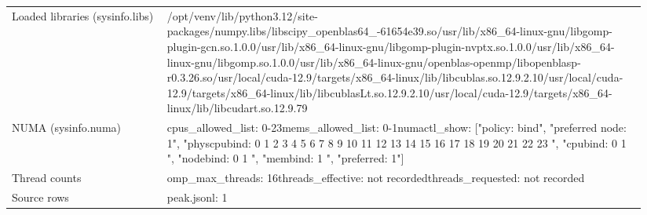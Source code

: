 \begin{longtable}{>{\raggedright\arraybackslash}p{0.23\linewidth}>{\raggedright\arraybackslash}p{0.71\linewidth}}
Loaded libraries (sysinfo.libs) & /\allowbreak{}opt/\allowbreak{}venv/\allowbreak{}lib/\allowbreak{}python3.12/\allowbreak{}site-packages/\allowbreak{}numpy.libs/\allowbreak{}libscipy\_\allowbreak{}openblas64\_\allowbreak{}-61654e39.so\newline /\allowbreak{}usr/\allowbreak{}lib/\allowbreak{}x86\_\allowbreak{}64-linux-gnu/\allowbreak{}libgomp-plugin-gcn.so.1.0.0\newline /\allowbreak{}usr/\allowbreak{}lib/\allowbreak{}x86\_\allowbreak{}64-linux-gnu/\allowbreak{}libgomp-plugin-nvptx.so.1.0.0\newline /\allowbreak{}usr/\allowbreak{}lib/\allowbreak{}x86\_\allowbreak{}64-linux-gnu/\allowbreak{}libgomp.so.1.0.0\newline /\allowbreak{}usr/\allowbreak{}lib/\allowbreak{}x86\_\allowbreak{}64-linux-gnu/\allowbreak{}openblas-openmp/\allowbreak{}libopenblasp-r0.3.26.so\newline /\allowbreak{}usr/\allowbreak{}local/\allowbreak{}cuda-12.9/\allowbreak{}targets/\allowbreak{}x86\_\allowbreak{}64-linux/\allowbreak{}lib/\allowbreak{}libcublas.so.12.9.2.10\newline /\allowbreak{}usr/\allowbreak{}local/\allowbreak{}cuda-12.9/\allowbreak{}targets/\allowbreak{}x86\_\allowbreak{}64-linux/\allowbreak{}lib/\allowbreak{}libcublasLt.so.12.9.2.10\newline /\allowbreak{}usr/\allowbreak{}local/\allowbreak{}cuda-12.9/\allowbreak{}targets/\allowbreak{}x86\_\allowbreak{}64-linux/\allowbreak{}lib/\allowbreak{}libcudart.so.12.9.79 \\
NUMA (sysinfo.numa) & cpus\_\allowbreak{}allowed\_\allowbreak{}list: 0-23\newline mems\_\allowbreak{}allowed\_\allowbreak{}list: 0-1\newline numactl\_\allowbreak{}show: ["policy: bind", "preferred node: 1", "physcpubind: 0 1 2 3 4 5 6 7 8 9 10 11 12 13 14 15 16 17 18 19 20 21 22 23 ", "cpubind: 0 1 ", "nodebind: 0 1 ", "membind: 1 ", "preferred: 1"] \\
Thread counts & omp\_\allowbreak{}max\_\allowbreak{}threads: 16\newline threads\_\allowbreak{}effective: not recorded\newline threads\_\allowbreak{}requested: not recorded \\
Source rows & peak.jsonl: 1 \\
\end{longtable}
